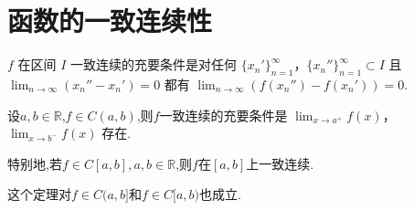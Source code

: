 \documentclass[../../main.tex]{subfiles}%
\begin{document}
\section{函数的一致连续性}

\begin{theorem}\label{theorem:一致连续的充要条件1}
\(f\) 在区间 \(I\) 一致连续的充要条件是对任何 \(\{x_n'\}_{n = 1}^{\infty}\)，\(\{x_n''\}_{n = 1}^{\infty}\subset I\) 且 \(\lim_{n\rightarrow\infty}(x_n'' - x_n') = 0\) 都有 \(\lim_{n\rightarrow\infty}(f(x_n'') - f(x_n'))=0\).
\end{theorem}

\begin{theorem}\label{theroem:Heine-Cantor定理}
设$a,b\in \mathbb{R}$,\(f\in C(a,b)\),则$f$一致连续的充要条件是 \(\lim_{x\rightarrow a^{+}}f(x)\)，\(\lim_{x\rightarrow b^{-}}f(x)\) 存在.

特别地,若$f\in C[a,b],a,b\in \mathbb{R}$,则$f$在$[a,b]$上一致连续.
\end{theorem}
\begin{remark}
这个定理对$f\in C(a,b]$和$f\in C[a,b)$也成立.
\end{remark}
\end{document}
